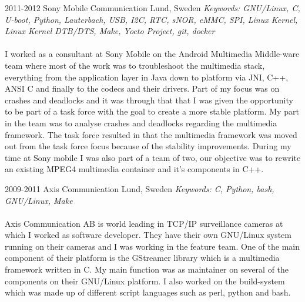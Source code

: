 \documentclass[nocolors]{template/friggeri-cv-a4}
\begin{document}
\begin{entrylist}


\entry
{2011-2012}
{Sony Mobile Communication}
{Lund, Sweden}
{\emph{Keywords: GNU/Linux, C, U-boot, Python, Lauterbach, USB, I2C, RTC, sNOR, eMMC, SPI, Linux Kernel, Linux Kernel DTB/DTS, Make, Yocto Project, git, docker} \\
\\
I worked as a consultant at Sony Mobile on the Android Multimedia Middle-ware team where most of the work was to troubleshoot the multimedia stack, everything from the application layer in Java down to platform via JNI, C++, ANSI C and finally to the codecs and their drivers. Part of my focus was on crashes and deadlocks and it was through that that I was given the opportunity to be part of a task force with the goal to create a more stable platform. My part in the team was to analyse crashes and deadlocks regarding the multimedia framework. The task force resulted in that the multimedia framework was moved out from the task force focus because of the stability improvements. During my time at Sony mobile I was also part of a team of two, our objective was to rewrite an existing MPEG4 multimedia container and it's components in C++.
\\
}


\entry
{2009-2011}
{Axis Communication}
{Lund, Sweden}
{\emph{Keywords: C, Python, bash, GNU/Linux, Make} \\
\\
Axis Communication AB is world leading in TCP/IP surveillance cameras at which I worked as software developer. They have their own GNU/Linux system running on their cameras and I was working in the feature team. One of the main component of their platform is the GStreamer library which is a multimedia framework written in C. My main function was as maintainer on several of the components on their GNU/Linux platform. I also worked on the build-system which was made up of different script languages such as perl, python and bash.
\\
}



\end{entrylist}
\end{document}
